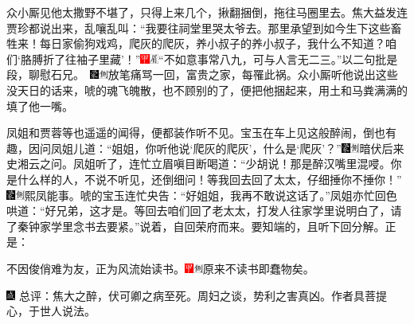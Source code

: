 众小厮见他太撒野不堪了，只得上来几个，揪翻捆倒，拖往马圈里去。焦大益发连贾珍都说出来，乱嚷乱叫：“我要往祠堂里哭太爷去。那里承望到如今生下这些畜牲来！每日家偷狗戏鸡，爬灰的爬灰，养小叔子的养小叔子，我什么不知道？咱们‘胳膊折了往袖子里藏’！”{{\includegraphics[width=3mm]{../Images/00002}\includegraphics[width=3mm]{../Images/00010}\footnotesize \kaishu “不如意事常八九，可与人言无二三。”以二句批是段，聊慰石兄。　}\includegraphics[width=3mm]{../Images/00006}\includegraphics[width=3mm]{../Images/00011}\footnotesize \kaishu 放笔痛骂一回，富贵之家，每罹此祸。}众小厮听他说出这些没天日的话来，唬的魂飞魄散，也不顾别的了，便把他捆起来，用土和马粪满满的填了他一嘴。

凤姐和贾蓉等也遥遥的闻得，便都装作听不见。宝玉在车上见这般醉闹，倒也有趣，因问凤姐儿道：“姐姐，你听他说‘爬灰的爬灰’，什么是‘爬灰’？”{\includegraphics[width=3mm]{../Images/00006}\includegraphics[width=3mm]{../Images/00011}\footnotesize \kaishu 暗伏后来史湘云之问。}凤姐听了，连忙立眉嗔目断喝道：“少胡说！那是醉汉嘴里混唚。你是什么样的人，不说不听见，还倒细问！等我回去回了太太，仔细捶你不捶你！”{\includegraphics[width=3mm]{../Images/00006}\includegraphics[width=3mm]{../Images/00011}\footnotesize \kaishu 熙凤能事。}唬的宝玉连忙央告：“好姐姐，我再不敢说这话了。”凤姐亦忙回色哄道：“好兄弟，这才是。等回去咱们回了老太太，打发人往家学里说明白了，请了秦钟家学里念书去要紧。”说着，自回荣府而来。要知端的，且听下回分解。正是：

不因俊俏难为友，正为风流始读书。{\includegraphics[width=3mm]{../Images/00002}\includegraphics[width=3mm]{../Images/00011}\footnotesize \kaishu 原来不读书即蠢物矣。}

{\includegraphics[width=3mm]{../Images/00005}  \kaishu 总评：焦大之醉，伏可卿之病至死。周妇之谈，势利之害真凶。作者具菩提心，于世人说法。}